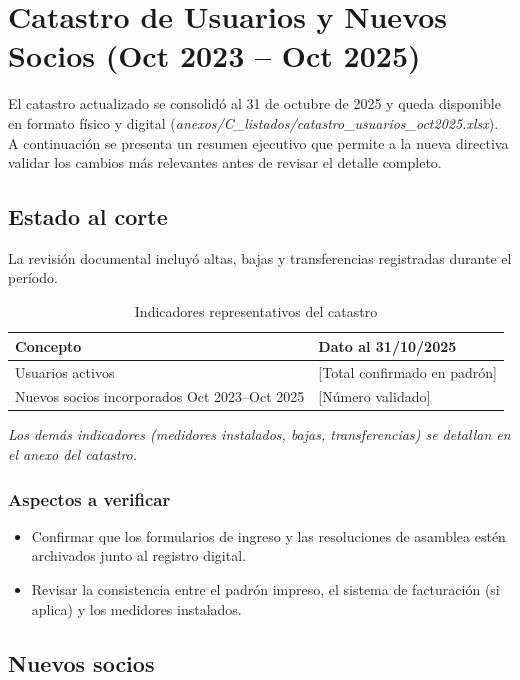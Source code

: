 \chapter{Catastro de Usuarios y Nuevos Socios (Oct 2023 -- Oct 2025)}

El catastro actualizado se consolidó al 31 de octubre de 2025 y queda disponible en formato físico y digital (\emph{anexos/C\_listados/catastro\_usuarios\_oct2025.xlsx}). A continuación se presenta un resumen ejecutivo que permite a la nueva directiva validar los cambios más relevantes antes de revisar el detalle completo.

\section{Estado al corte}

La revisión documental incluyó altas, bajas y transferencias registradas durante el período.

\begin{table}[H]
\centering
\caption{Indicadores representativos del catastro}
\label{tab:catastro_resumen}
\begin{tabular}{p{6.5cm} p{5.5cm}}
\toprule
\textbf{Concepto} & \textbf{Dato al 31/10/2025} \\
\midrule
Usuarios activos & [Total confirmado en padrón] \\
Nuevos socios incorporados Oct 2023--Oct 2025 & [Número validado] \\
\bottomrule
\end{tabular}
\end{table}
\textit{Los demás indicadores (medidores instalados, bajas, transferencias) se detallan en el anexo del catastro.}

\subsection*{Aspectos a verificar}
\begin{itemize}[noitemsep, topsep=0pt]
  \item Confirmar que los formularios de ingreso y las resoluciones de asamblea estén archivados junto al registro digital.
  \item Revisar la consistencia entre el padrón impreso, el sistema de facturación (si aplica) y los medidores instalados.
\end{itemize}

\section{Nuevos socios}

